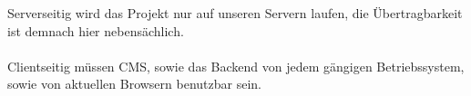 Serverseitig wird das Projekt nur auf unseren Servern laufen, die Übertragbarkeit ist demnach hier nebensächlich.\\
\\
Clientseitig müssen CMS, sowie das Backend von jedem gängigen Betriebssystem, sowie von aktuellen Browsern benutzbar sein.